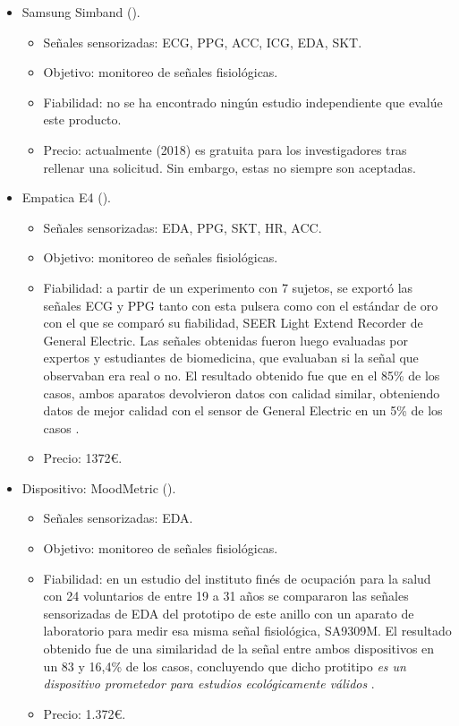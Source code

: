 \begin{itemize}
    \item Samsung Simband (\citeyear{simband}).
    \begin{itemize}
        \item Señales sensorizadas: ECG, PPG, ACC, ICG, EDA, SKT.
        \item Objetivo: monitoreo de señales fisiológicas.
        \item Fiabilidad: no se ha encontrado ningún estudio independiente que evalúe este producto.
        \item Precio: actualmente (2018) es gratuita para los investigadores tras rellenar una solicitud. Sin embargo, estas no siempre son aceptadas.
    \end{itemize}

    \item Empatica E4 (\citeyear{garbarino2014empatica}).
    \begin{itemize}
        \item Señales sensorizadas: EDA, PPG, SKT, HR, ACC.
        \item Objetivo: monitoreo de señales fisiológicas.
        \item Fiabilidad: a partir de un experimento con 7 sujetos, se exportó las señales ECG y PPG tanto con esta pulsera como con el estándar de oro con el que se comparó su fiabilidad, SEER Light Extend Recorder de General Electric. Las señales obtenidas fueron luego evaluadas por expertos y estudiantes de biomedicina, que evaluaban si la señal que observaban era real o no. El resultado obtenido fue que en el 85\% de los casos, ambos aparatos devolvieron datos con calidad similar, obteniendo datos de mejor calidad con el sensor de General Electric en un 5\% de los casos \citep{mccarthy2016validation}.
        \item Precio: 1372€.
    \end{itemize}

    \item Dispositivo: MoodMetric (\citeyear{moodmetric}).
    \begin{itemize}
        \item Señales sensorizadas: EDA.
        \item Objetivo: monitoreo de señales fisiológicas.
        \item Fiabilidad: en un estudio del instituto finés de ocupación para la salud con 24 voluntarios de entre 19 a 31 años se compararon las señales sensorizadas de EDA del prototipo de este anillo con un aparato de laboratorio para medir esa misma señal fisiológica, SA9309M. El resultado obtenido fue de una similaridad de la señal entre ambos dispositivos en un 83 y 16,4\% de los casos, concluyendo que dicho protitipo \textit{es un dispositivo prometedor para estudios ecológicamente válidos} \citep{torniainen2015feasibility}.
        \item Precio: 1.372€.
    \end{itemize}

\end{itemize}

